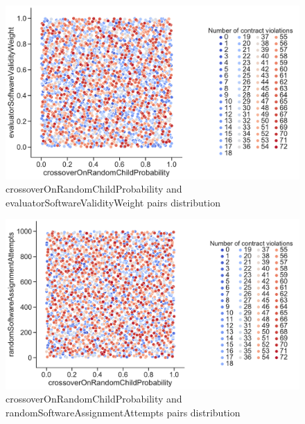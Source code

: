 \begin{figure}
	\centering
	\includegraphics[width=\textwidth]{images/PairsDistr/crossoverOnRandomChildProbability_evaluatorSoftwareValidityWeight.pdf}
	\caption[crossoverOnRandomChildProbability and evaluatorSoftwareValidityWeight pairs distribution]{crossoverOnRandomChildProbability and evaluatorSoftwareValidityWeight pairs distribution} 
	\label{fig:crossoverOnRandomChildProbability_evaluatorSoftwareValidityWeight_pair}
\end{figure}
\clearpage
\begin{figure}
	\centering
	\includegraphics[width=\textwidth]{images/PairsDistr/crossoverOnRandomChildProbability_randomSoftwareAssignmentAttempts.pdf}
	\caption[crossoverOnRandomChildProbability and randomSoftwareAssignmentAttempts pairs distribution]{crossoverOnRandomChildProbability and randomSoftwareAssignmentAttempts pairs distribution}
	\label{fig:crossoverOnRandomChildProbability_randomSoftwareAssignmentAttempts_pair}
\end{figure}
\clearpage
